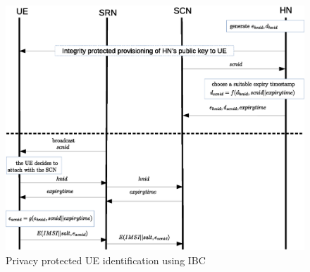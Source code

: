 \documentclass[lnicst,sechang,a4paper]{svmultln}
\begin{document}
\begin{figure}
\begin{center}
  \includegraphics[width=.98\textwidth]{solution_based_on_ibc.eps}
\caption{Privacy protected UE identification using IBC}
\label{fig:solution_ibc}       %
\end{center}
\end{figure}





\end{document}
